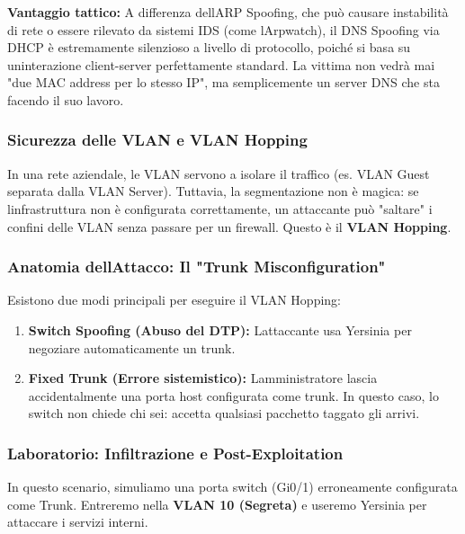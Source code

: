 \documentclass[11pt,a4paper]{article}
\begin{document}
\textbf{Vantaggio tattico:} A differenza dell\textquotesingle ARP
Spoofing, che può causare instabilità di rete o essere rilevato da
sistemi IDS (come l\textquotesingle Arpwatch), il DNS Spoofing via DHCP
è estremamente silenzioso a livello di protocollo, poiché si basa su
un\textquotesingle interazione client-server perfettamente standard. La
vittima non vedrà mai "due MAC address per lo stesso IP", ma
semplicemente un server DNS che sta facendo il suo lavoro.

\subsubsection{Sicurezza delle VLAN e VLAN
Hopping}\label{sicurezza-delle-vlan-e-vlan-hopping}

In una rete aziendale, le VLAN servono a isolare il traffico (es. VLAN
Guest separata dalla VLAN Server). Tuttavia, la segmentazione non è
magica: se l\textquotesingle infrastruttura non è configurata
correttamente, un attaccante può "saltare" i confini delle VLAN senza
passare per un firewall. Questo è il \textbf{VLAN Hopping}.

\subsubsection{Anatomia dell\textquotesingle Attacco: Il "Trunk
Misconfiguration"}\label{anatomia-dellattacco-il-trunk-misconfiguration}

Esistono due modi principali per eseguire il VLAN Hopping:

\begin{enumerate}
\def\labelenumi{\arabic{enumi}.}
\item
  \textbf{Switch Spoofing (Abuso del DTP):} L\textquotesingle attaccante
  usa Yersinia per negoziare automaticamente un trunk.
\item
  \textbf{Fixed Trunk (Errore sistemistico):}
  L\textquotesingle amministratore lascia accidentalmente una porta host
  configurata come trunk. In questo caso, lo switch non chiede chi sei:
  accetta qualsiasi pacchetto taggato gli arrivi.
\end{enumerate}

\subsubsection{Laboratorio: Infiltrazione e
Post-Exploitation}\label{laboratorio-infiltrazione-e-post-exploitation}

In questo scenario, simuliamo una porta switch (Gi0/1) erroneamente
configurata come Trunk. Entreremo nella \textbf{VLAN 10 (Segreta)} e
useremo Yersinia per attaccare i servizi interni.
\end{document}
